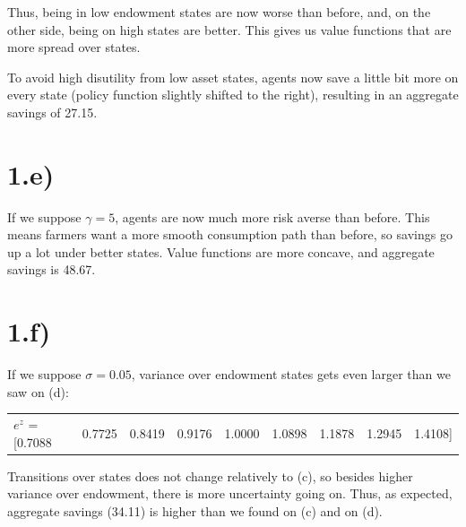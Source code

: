 \documentclass{article}
\begin{document}
Thus, being in low endowment states are now worse than before, and, on the
other side, being on high states are better. This gives us value functions
that are more spread over states.

To avoid high disutility from low asset states, agents now save a little bit
more on every state (policy function slightly shifted to the right), resulting
in an aggregate savings of 27.15.

\section*{1.e)}

If we suppose $\gamma = 5$, agents are now much more risk averse than
before. This means farmers want a more smooth consumption path than before,
so savings go up a lot under better states. Value functions are more concave, and 
aggregate savings is 48.67.

\section*{1.f)}

If we suppose $\sigma=0.05$, variance over endowment states gets even larger
than we saw on (d):

\begin{scriptsize}
\begin{tabular}{lllllllll}
   $e^z$ = [0.7088  &  0.7725  &  0.8419  &  0.9176 &  1.0000  &  1.0898  &  1.1878 &   1.2945  &  1.4108]
\end{tabular}
\end{scriptsize}

Transitions over states does not change relatively to (c), so
besides higher variance over endowment, there is more uncertainty going on.
Thus, as expected, aggregate savings (34.11) is higher than we found on (c) and on (d).

\begin{figure}[p]
    \vspace*{-2cm}
\end{figure}
\end{document}
